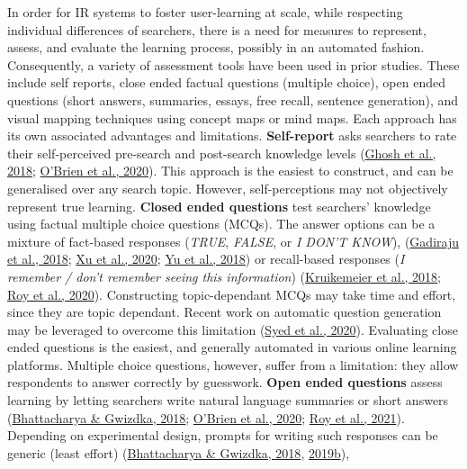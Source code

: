 \documentclass[letterpaper, nobind]{templates/ociamthesis}
\begin{document}
In order for IR systems to foster user-learning at scale, while
respecting individual differences of searchers, there is a need for
measures to represent, assess, and evaluate the learning process,
possibly in an automated fashion. Consequently, a variety of assessment
tools have been used in prior studies. These include self reports, close
ended factual questions (multiple choice), open ended questions (short
answers, summaries, essays, free recall, sentence generation), and
visual mapping techniques using concept maps or mind maps. Each approach
has its own associated advantages and limitations. \textbf{Self-report} asks
searchers to rate their self-perceived pre-search and post-search
knowledge levels (\protect\hyperlink{ref-ghosh2018SearchingLearningExploring}{Ghosh et al., 2018}; \protect\hyperlink{ref-o2020role}{O'Brien et al., 2020}).
This approach is the easiest to construct, and can be generalised over
any search topic. However, self-perceptions may not objectively
represent true learning. \textbf{Closed ended questions} test searchers'
knowledge using factual multiple choice questions (MCQs). The answer
options can be a mixture of fact-based responses (\emph{TRUE}, \emph{FALSE}, or \emph{I
DON'T KNOW}),
(\protect\hyperlink{ref-gadiraju2018AnalyzingKnowledgeGain}{Gadiraju et al., 2018}; \protect\hyperlink{ref-xu2020does}{Xu et al., 2020}; \protect\hyperlink{ref-yu2018PredictingUserKnowledgea}{Yu et al., 2018})
or recall-based responses (\emph{I remember / don't remember seeing this
information}) (\protect\hyperlink{ref-kruikemeier2018learning}{Kruikemeier et al., 2018}; \protect\hyperlink{ref-roy2020exploring}{Roy et al., 2020}).
Constructing topic-dependant MCQs may take time and effort, since they
are topic dependant. Recent work on automatic question generation may be
leveraged to overcome this limitation (\protect\hyperlink{ref-syed2020improving}{Syed et al., 2020}). Evaluating
close ended questions is the easiest, and generally automated in various
online learning platforms. Multiple choice questions, however, suffer
from a limitation: they allow respondents to answer correctly by
guesswork. \textbf{Open ended questions} assess learning by letting searchers
write natural language summaries or short answers
(\protect\hyperlink{ref-bhattacharya2018relating}{Bhattacharya \& Gwizdka, 2018}; \protect\hyperlink{ref-o2020role}{O'Brien et al., 2020}; \protect\hyperlink{ref-roy2021note}{Roy et al., 2021}). Depending on
experimental design, prompts for writing such responses can be generic
(least effort) (\protect\hyperlink{ref-bhattacharya2018relating}{Bhattacharya \& Gwizdka, 2018}, \protect\hyperlink{ref-bhattacharya2019measuring}{2019b}),
\end{document}
